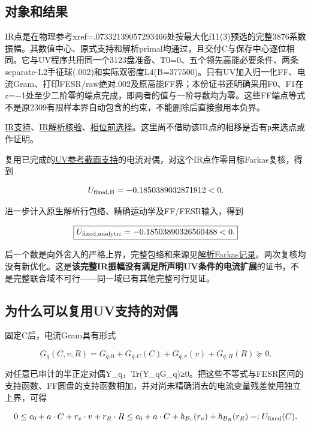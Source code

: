 \documentclass[
  10pt,
  a4paper,
]{article}
\begin{document}
\subsection{对象和结果}\label{ux5bf9ux8c61ux548cux7ed3ux679c}

IR点是在物理参考xref=.07332139057293466处按最大化f11(3)预选的完整3876系数振幅。其数值中心、原式支持和解析primal均通过，且交付C与保存中心逐位相同。它与UV程序共用同一个3123盘准备、T0=0、五个领先高能必要条件、两条separate-L2手征球(.002)和实际双密度L4(B=377500)。只有UV加入归一化FF、电流Gram、打印FESR/raw绝对.002及原高能FF界；本份证书还明确采用F0、F1在z=−1处至少二阶零的端点完成，即两者的值与一阶导数均为零。这些FF端点等式不是原2309有限样本界自动包含的约束，不能删除后直接搬用本负界。

\href{../interlaced_IR_ref_02/report.json}{IR支持}、\href{../interlaced_IR_ref_analytic/source_audit.json}{IR解析核验}、\href{../interlaced_IR_selected/selection.json}{相位前选择}。这里尚不借助该IR点的相移是否有ρ来选点或作证明。

复用已完成的\href{../interlaced_UV_ref_support_01/report.json}{UV参考截面支持}的电流对偶，对这个IR点作零目标Farkas复核，得到

\[
U_{\rm fixed,H}=-0.1850389032871912<0.
\]

进一步计入原生解析行包络、精确运动学及FF/FESR输入，得到

\[
\boxed{U_{\rm fixed,analytic}=-0.18503890326560488<0.}
\]

后一个数是向外舍入的严格上界，完整包络和来源见\href{../interlaced_fixed_IR_analytic/report.json}{解析Farkas记录}。两次复核均没有新优化。这是\textbf{该完整IR振幅没有满足所声明UV条件的电流扩展}的证书，不是完整联合域不可行------同一域已有其他完整可行见证。

\subsection{为什么可以复用UV支持的对偶}\label{ux4e3aux4ec0ux4e48ux53efux4ee5ux590dux7528uvux652fux6301ux7684ux5bf9ux5076}

固定C后，电流Gram具有形式

\[
G_q(C,v,R)=G_{q,0}+G_{q,C}(C)+G_{q,v}(v)+G_{q,R}(R)\succeq0.
\]

对任意已审计的半正定对偶Y\_q，Tr(Y\_qG\_q)≥0。把这些不等式与FESR区间的支持函数、FF圆盘的支持函数相加，并对尚未精确消去的电流变量残差使用独立上界，可得

\[
0\le c_0+a\cdot C+r_v\cdot v+r_R\cdot R
\le c_0+a\cdot C+h_{\mathcal B_v}(r_v)+h_{\mathcal B_R}(r_R)
=:U_{\rm fixed}(C).
\]
\end{document}
